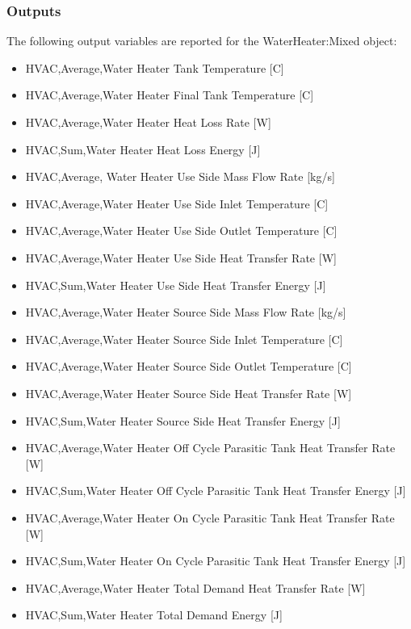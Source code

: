 \subsubsection{Outputs}\label{outputs-040}

The following output variables are reported for the WaterHeater:Mixed object:

\begin{itemize}
\item
  HVAC,Average,Water Heater Tank Temperature {[}C{]}
\item
  HVAC,Average,Water Heater Final Tank Temperature {[}C{]}
\item
  HVAC,Average,Water Heater Heat Loss Rate {[}W{]}
\item
  HVAC,Sum,Water Heater Heat Loss Energy {[}J{]}
\item
  HVAC,Average, Water Heater Use Side Mass Flow Rate {[}kg/s{]}
\item
  HVAC,Average,Water Heater Use Side Inlet Temperature {[}C{]}
\item
  HVAC,Average,Water Heater Use Side Outlet Temperature {[}C{]}
\item
  HVAC,Average,Water Heater Use Side Heat Transfer Rate {[}W{]}
\item
  HVAC,Sum,Water Heater Use Side Heat Transfer Energy {[}J{]}
\item
  HVAC,Average,Water Heater Source Side Mass Flow Rate {[}kg/s{]}
\item
  HVAC,Average,Water Heater Source Side Inlet Temperature {[}C{]}
\item
  HVAC,Average,Water Heater Source Side Outlet Temperature {[}C{]}
\item
  HVAC,Average,Water Heater Source Side Heat Transfer Rate {[}W{]}
\item
  HVAC,Sum,Water Heater Source Side Heat Transfer Energy {[}J{]}
\item
  HVAC,Average,Water Heater Off Cycle Parasitic Tank Heat Transfer Rate {[}W{]}
\item
  HVAC,Sum,Water Heater Off Cycle Parasitic Tank Heat Transfer Energy {[}J{]}
\item
  HVAC,Average,Water Heater On Cycle Parasitic Tank Heat Transfer Rate {[}W{]}
\item
  HVAC,Sum,Water Heater On Cycle Parasitic Tank Heat Transfer Energy {[}J{]}
\item
  HVAC,Average,Water Heater Total Demand Heat Transfer Rate {[}W{]}
\item
  HVAC,Sum,Water Heater Total Demand Energy {[}J{]}

\end{itemize}
